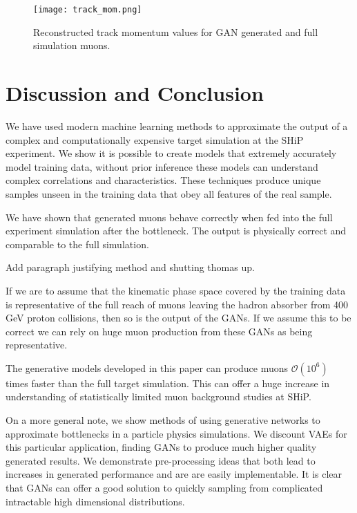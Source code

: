 \documentclass{article}
\begin{document}
            \begin{figure}[h!]\label{track_mom}
            \centering
            \texttt{[image: track\_mom.png]}
            \caption{Reconstructed track momentum values for GAN generated and full simulation muons.}
            \label{track_mom}
            \end{figure}



\section{Discussion and Conclusion}

We have used modern machine learning methods to approximate the output of a complex and computationally expensive target simulation at the SHiP experiment. We show it is possible to create models that extremely accurately model training data, without prior inference these models can understand complex correlations and characteristics. These techniques produce unique samples unseen in the training data that obey all features of the real sample. 

We have shown that generated muons behave correctly when fed into the full experiment simulation after the bottleneck. The output is physically correct and comparable to the full simulation. 

Add paragraph justifying method and shutting thomas up.

If we are to assume that the kinematic phase space covered by the training data is representative of the full reach of muons leaving the hadron absorber from 400 GeV proton collisions, then so is the output of the GANs. If we assume this to be correct we can rely on huge muon production from these GANs as being representative.  

The generative models developed in this paper can produce muons $\mathcal{O}(10^{6})$ times faster than the full target simulation. This can offer a huge increase in understanding of statistically limited muon background studies at SHiP. 

On a more general note, we show methods of using generative networks to approximate bottlenecks in a particle physics simulations. We discount VAEs for this particular application, finding GANs to produce much higher quality generated results. We demonstrate pre-processing ideas that both lead to increases in generated performance and are are easily implementable. It is clear that GANs can offer a good solution to quickly sampling from complicated intractable high dimensional distributions. 
\end{document}
